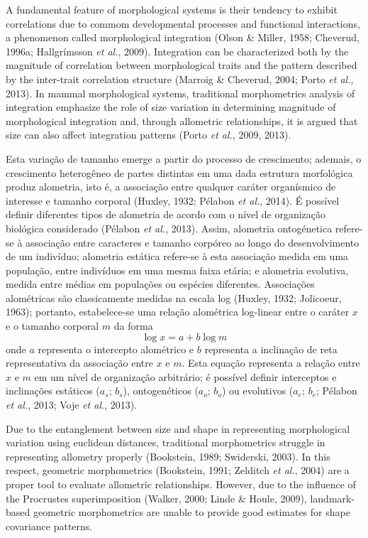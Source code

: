 \documentclass[11pt,twoside]{report}
\begin{document}
A fundamental feature of morphological systems is their tendency to
exhibit correlations due to commom developmental processes and
functional interactions, a phenomenon called morphological integration
(Olson \& Miller, 1958; Cheverud, 1996a; Hallgrímsson \emph{et al.},
2009). Integration can be characterized both by the magnitude of
correlation between morphological traits and the pattern described by
the inter-trait correlation structure (Marroig \& Cheverud, 2004; Porto
\emph{et al.}, 2013). In mammal morphological systems, traditional
morphometrics analysis of integration emphasize the role of size
variation in determining magnitude of morphological integration and,
through allometric relationships, it is argued that size can also affect
integration patterns (Porto \emph{et al.}, 2009, 2013).

Esta variação de tamanho emerge a partir do processo de crescimento;
ademais, o crescimento heterogêneo de partes distintas em uma dada
estrutura morfológica produz alometria, isto é, a associação entre
qualquer caráter organísmico de interesse e tamanho corporal (Huxley,
1932; Pélabon \emph{et al.}, 2014). É possível definir diferentes tipos
de alometria de acordo com o nível de organização biológica considerado
(Pélabon \emph{et al.}, 2013). Assim, alometria ontogénetica refere-se à
associação entre caracteres e tamanho corpóreo ao longo do
desenvolvimento de um indivíduo; alometria estática refere-se à esta
associação medida em uma população, entre indivíduos em uma mesma faixa
etária; e alometria evolutiva, medida entre médias em populações ou
espécies diferentes. Associações alométricas são classicamente medidas
na escala log (Huxley, 1932; Jolicoeur, 1963); portanto, estabelece-se
uma relação alométrica log-linear entre o caráter $x$ e o tamanho
corporal $m$ da forma \[
\log x = a + b \log m
\] onde $a$ representa o intercepto alométrico e $b$ representa a
inclinação de reta representativa da associação entre $x$ e $m$. Esta
equação representa a relação entre $x$ e $m$ em um nível de organização
arbitrário; é possível definir interceptos e inclinações estáticos
($a_s$; $b_s$), ontogenéticos ($a_o$; $b_o$) ou evolutivos ($a_e$;
$b_e$; Pélabon \emph{et al.}, 2013; Voje \emph{et al.}, 2013).

Due to the entanglement between size and shape in representing
morphological variation using euclidean distances, traditional
morphometrics struggle in representing allometry properly (Bookstein,
1989; Swiderski, 2003). In this respect, geometric morphometrics
(Bookstein, 1991; Zelditch \emph{et al.}, 2004) are a proper tool to
evaluate allometric relationships. However, due to the influence of the
Procrustes superimposition (Walker, 2000; Linde \& Houle, 2009),
landmark-based geometric morphometrics are unable to provide good
estimates for shape covariance patterns.
\end{document}
